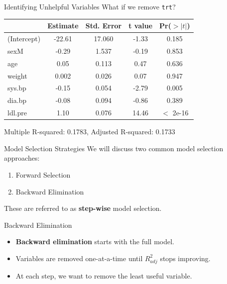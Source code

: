 \begin{frame}{Identifying Unhelpful Variables}
    What if we remove \texttt{trt}?
    \begin{table}[h]
        \centering
        \begin{tabular}{lcccc}
            \hline
                        & Estimate & Std. Error & t value & Pr($>|t|$) \\
            \hline
            (Intercept) & -22.61 & 17.060 & -1.33 & 0.185    \\ 
            sexM     &    -0.29  & 1.537 & -0.19 & 0.853     \\
            age      &     0.05  & 0.113 &  0.47 & 0.636     \\
            weight   &     0.002  & 0.026 &  0.07 & 0.947     \\
            sys.bp   &    -0.15  & 0.054 & -2.79 & 0.005   \\
            dia.bp   &    -0.08  & 0.094 & -0.86 & 0.389     \\
            ldl.pre  &     1.10  & 0.076 & 14.46 & $<$ 2e-16 \\
            \hline
        \end{tabular}
    \end{table}
    Multiple R-squared:  0.1783,	Adjusted R-squared:  0.1733
\end{frame}

\begin{frame}{Model Selection Strategies}
    We will discuss two common model selection approaches:
    \begin{enumerate}
        \item Forward Selection
        \item Backward Elimination
    \end{enumerate}
    These are referred to as \textbf{step-wise} model selection. 
\end{frame}

\begin{frame}{Backward Elimination}
    \begin{itemize}
        \item \textbf{Backward elimination} starts with the full model.
        \item Variables are removed one-at-a-time until $R^2_{adj}$ stops improving.
        \item At each step, we want to remove the least useful variable.
    \end{itemize}
\end{frame}

